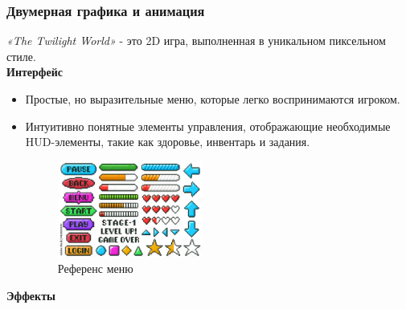 \documentclass{article}
\begin{document}
	\subsubsection{Двумерная графика и анимация}
	\textit{«The Twilight World»} - это 2D игра, выполненная в уникальном пиксельном стиле. \\
	\textbf{Интерфейс}
	\begin{itemize}
		\item Простые, но выразительные меню, которые легко воспринимаются игроком.
		\item Интуитивно понятные элементы управления, отображающие необходимые HUD-элементы, такие как здоровье, инвентарь и задания.
		\newpage
		
		\begin{figure}[h]
			\centering
			\includegraphics[width=0.45\textwidth]{images/menu.jpg}
			\caption{Референс меню}
			\label{fig:menu}
		\end{figure}
	\end{itemize}
	\textbf{Эффекты}
\end{document}
